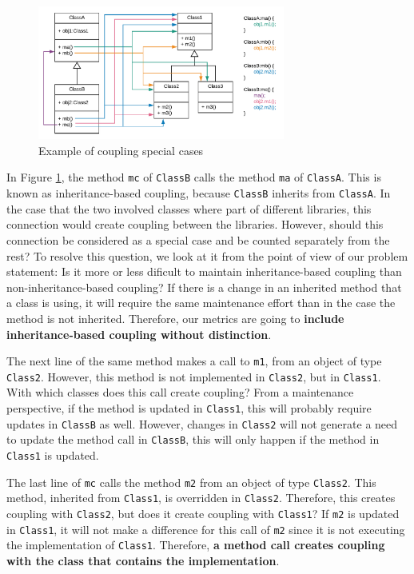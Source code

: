 \documentclass[a4paper]{article}
\begin{document}
\begin{figure}[ht]
\begin{center}
\includegraphics[height=4.4cm]{img/specialcases.png}
\caption{Example of coupling special cases}
\label{fig:specialcases}
\end{center}
\end{figure}

In Figure \ref{fig:specialcases}, the method \texttt{mc} of \texttt{ClassB} calls the method \texttt{ma} of \texttt{ClassA}. This is known as inheritance-based coupling, because \texttt{ClassB} inherits from \texttt{ClassA}. In the case that the two involved classes where part of different libraries, this connection would create coupling between the libraries. However, should this connection be considered as a special case and be counted separately from the rest? To resolve this question, we look at it from the point of view of our problem statement: Is it more or less dificult to maintain inheritance-based coupling than non-inheritance-based coupling? If there is a change in an inherited method that a class is using, it will require the same maintenance effort than in the case the method is not inherited. Therefore, our metrics are going to \textbf{include inheritance-based coupling without distinction}.

The next line of the same method makes a call to \texttt{m1}, from an object of type \texttt{Class2}. However, this method is not implemented in \texttt{Class2}, but in \texttt{Class1}. With which classes does this call create coupling? From a maintenance perspective, if the method is updated in \texttt{Class1}, this will probably require updates in \texttt{ClassB} as well. However, changes in \texttt{Class2} will not generate a need to update the method call in \texttt{ClassB}, this will only happen if the method in \texttt{Class1} is updated.

The last line of \texttt{mc} calls the method \texttt{m2} from an object of type \texttt{Class2}. This method, inherited from \texttt{Class1}, is overridden in \texttt{Class2}. Therefore, this creates coupling with \texttt{Class2}, but does it create coupling with \texttt{Class1}? If  \texttt{m2} is updated in \texttt{Class1}, it will not make a difference for this call of \texttt{m2} since it is not executing the implementation of \texttt{Class1}. Therefore, \textbf{a method call creates coupling with the class that contains the implementation}.
\end{document}
